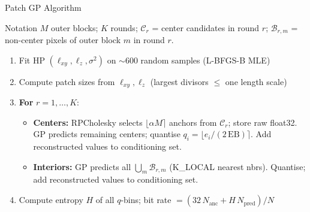 \documentclass[10pt]{beamer}
\begin{document}
\begin{frame}{Patch GP Algorithm}
  \begin{block}{Notation}
    $M$ outer blocks;\; $K$ rounds;\;
    $\mathcal{C}_r$ = center candidates in round $r$;\;
    $\mathcal{B}_{r,m}$ = non-center pixels of outer block $m$ in round $r$.
  \end{block}
  \vspace{2pt}
  \begin{enumerate}
    \item Fit HP $(\ell_{xy},\ell_z,\sigma^2)$ on $\sim\!600$ random samples (L-BFGS-B MLE)
    \item Compute patch sizes from $\ell_{xy},\ell_z$ (largest divisors $\le$ one length scale)
    \item \textbf{For} $r = 1,\ldots,K$:
    \begin{itemize}
      \item[\textbf{A.}] \textbf{Centers:} RPCholesky selects $\lfloor\alpha M\rceil$ anchors from $\mathcal{C}_r$; store raw float32.
            GP predicts remaining centers; quantise $q_i=\lfloor e_i/(2\,\mathrm{EB})\rceil$.
            Add reconstructed values to conditioning set.
      \item[\textbf{B.}] \textbf{Interiors:} GP predicts all $\bigcup_m \mathcal{B}_{r,m}$ (K\_LOCAL nearest nbrs).
            Quantise; add reconstructed values to conditioning set.
    \end{itemize}
    \item Compute entropy $H$ of all $q$-bins;\; bit rate $= (32\,N_\mathrm{anc} + H\,N_\mathrm{pred})/N$
  \end{enumerate}
\end{frame}
\end{document}
